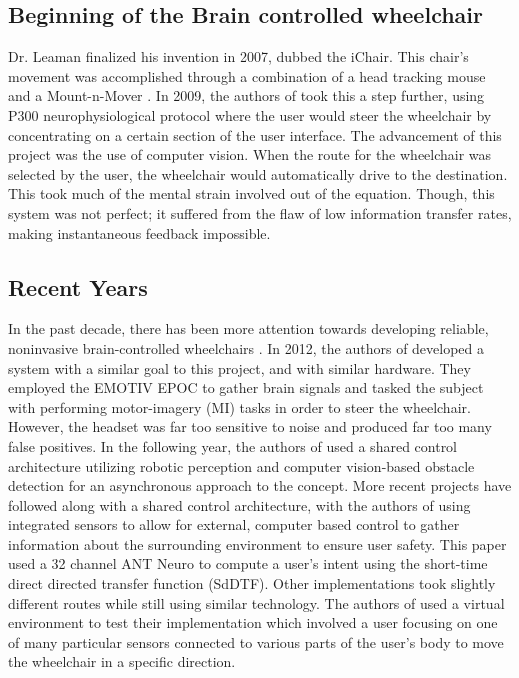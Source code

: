 \documentclass[conference]{IEEEtran}
\begin{document}
    \subsection{Beginning of the Brain controlled wheelchair}
    Dr. Leaman finalized his invention in 2007, dubbed the iChair. This chair's movement was accomplished through a combination of a head tracking mouse and a Mount-n-Mover \cite{a_comprehensive_review}. In 2009, the authors of \cite{noninvasive_brain} took this a step further, using P300 neurophysiological protocol where the user would steer the wheelchair by concentrating on a certain section of the user interface. The advancement of this project was the use of computer vision. When the route for the wheelchair was selected by the user, the wheelchair would automatically drive to the destination. This took much of the mental strain involved out of the equation. Though, this system was not perfect; it suffered from the flaw of low information transfer rates, making instantaneous feedback impossible.  
    
    \subsection{Recent Years}
    In the past decade, there has been more attention towards developing reliable, noninvasive brain-controlled wheelchairs \cite{learning_to_control, self_paced, robotic_architecture, toward_brain_computer, biomedical-signal}. In 2012, the authors of \cite{self_paced} developed a system with a similar goal to this project, and with similar hardware. They employed the EMOTIV EPOC to gather brain signals and tasked the subject with performing motor-imagery (MI) tasks in order to steer the wheelchair. However, the headset was far too sensitive to noise and produced far too many false positives. In the following year, the authors of \cite{robotic_architecture} used a shared control architecture utilizing robotic perception and computer vision-based obstacle detection for an asynchronous approach to the concept. More recent projects have followed along with a shared control architecture, with the authors of \cite{learning_to_control} using integrated sensors to allow for external, computer based control to gather information about the surrounding environment to ensure user safety. This paper used a 32 channel ANT Neuro to compute a user's intent using the short-time direct directed transfer function (SdDTF). Other implementations took slightly different routes while still using similar technology. The authors of \cite{toward_brain_computer} used a virtual environment to test their implementation which involved a user focusing on one of many particular sensors connected to various parts of the user's body to move the wheelchair in a specific direction. 
\end{document}
